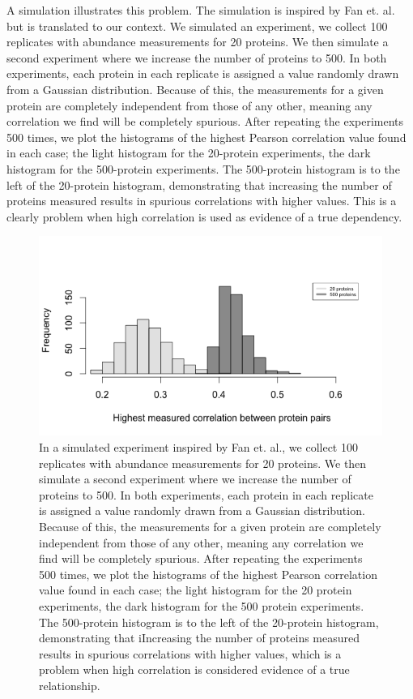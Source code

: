 \documentclass[journal=jacsat,manuscript=article]{achemso}
\begin{document}
A simulation illustrates this problem.  The simulation is inspired  by Fan et. al. but is translated to our context. We simulated an experiment, we collect 100 replicates with abundance measurements for 20 proteins.  We then simulate a second experiment where we increase the number of proteins to 500.  In both experiments, each protein in each replicate is assigned a value randomly drawn from a Gaussian distribution.  Because of this, the measurements  for a given protein are completely independent from those of any other, meaning any correlation we find will be completely spurious.   After repeating the experiments 500 times, we plot the histograms of the highest Pearson correlation value found in each case; the light histogram for the 20-protein experiments, the dark histogram for the 500-protein experiments. The 500-protein histogram is to the left of the 20-protein histogram, demonstrating that increasing the number of proteins measured  results in spurious correlations with higher values.  This is a clearly problem when high correlation is used as evidence of a true dependency.


\begin{figure}[!tpb]
\centerline{\includegraphics[width=1\textwidth]{figs/spurious_corr.png}}
\caption{In a simulated experiment inspired by Fan et. al., we collect 100 replicates with abundance measurements for 20 proteins.  We then simulate a second experiment where we increase the number of proteins to 500.  In both experiments, each protein in each replicate is assigned a value randomly drawn from a Gaussian distribution.  Because of this, the measurements  for a given protein are completely independent from those of any other, meaning any correlation we find will be completely spurious.   After repeating the experiments 500 times, we plot the histograms of the highest Pearson correlation value found in each case; the light histogram for the 20 protein experiments, the dark histogram for the 500 protein experiments. The 500-protein histogram is to the left of the 20-protein histogram, demonstrating that iIncreasing the number of proteins measured  results in spurious correlations with higher values, which is a problem when high correlation is considered evidence of a true relationship.}
\label{spur_corr}
\end{figure}
\end{document}
